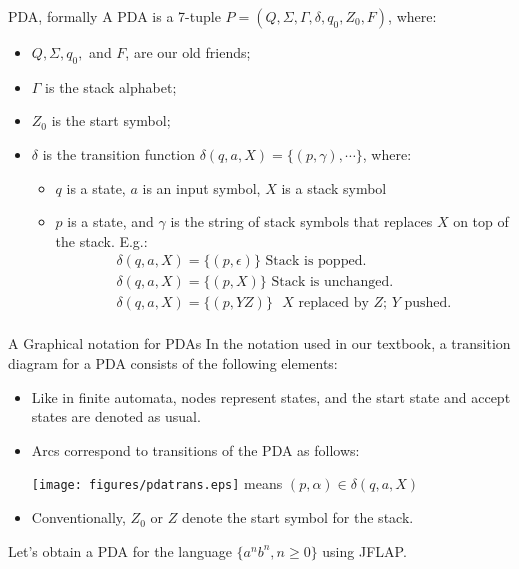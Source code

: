 \documentclass{prosper}%
\begin{document}
\begin{slide}{PDA, formally}
A PDA is a 7-tuple $P=(Q, \Sigma, \Gamma, \delta, q_0, Z_0, F)$, where:
\begin{itemize}
\item $Q, \Sigma, q_0,$ and $F$, are our old friends;
\item $\Gamma$ is the stack alphabet;
\item $Z_0$ is the start symbol;
\item $\delta$ is the transition function %
$\delta(q, a, X)=\{(p,\gamma),\cdots\}$, where:
\begin{itemize}
\item $q$ is  a state, $a$ is an input symbol, $X$ is a stack symbol
\item $p$ is a state, and $\gamma$ is the string of stack symbols that {\blue replaces $X$} on top of the stack. E.g.:
\[
\begin{array}{l}
\delta(q, a ,X) =\{(p,\epsilon)\} \mbox{ Stack is popped.}\\
\delta(q, a, X)=\{(p, X)\} \mbox{ Stack is unchanged.}\\
\delta(q, a, X)=\{(p, YZ)\} \mbox{ $X$ replaced by $Z$; $Y$ pushed.}\\
\end{array}
\]
\end{itemize}
\end{itemize}
\end{slide}

\begin{slide}{A Graphical notation for PDAs}
In the notation used in our textbook, a transition diagram for a  PDA consists of the following elements:
\begin{itemize}
\item Like in finite automata, nodes represent states, and the start state and accept states are denoted as usual.
\item Arcs correspond to transitions of the PDA as follows:
\begin{center}
 \texttt{[image: figures/pdatrans.eps]} means $(p, \alpha)  \in \delta(q, a, X)$
 \end{center}
\item Conventionally, $Z_0$ or $Z$ denote the start symbol for the stack.
\end{itemize}
Let's obtain a PDA for the language $\{a^nb^n, n\geq 0\}$ using JFLAP.
\end{slide}
\end{document}
